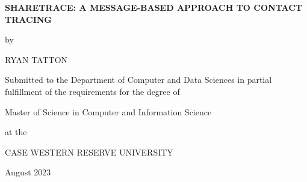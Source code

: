 \begin{titlepage}
\centering

\Large

\textbf{SHARETRACE: A MESSAGE-BASED APPROACH TO CONTACT TRACING}

\vspace{0.1in}

\large

by

\vspace{0.1in}

\Large

RYAN TATTON

\vspace{0.1in}

\large

Submitted to the Department of Computer and Data Sciences in partial
fulfillment of the requirements for the degree of

\vspace{0.1in}

Master of Science in Computer and Information Science

\vspace{0.1in}

at the

\vspace{0.1in}

CASE WESTERN RESERVE UNIVERSITY

\vspace{0.1in}

August 2023
\end{titlepage}